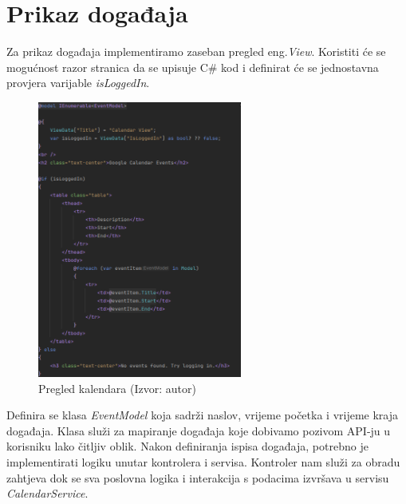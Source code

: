 \documentclass{foi}
\begin{document}
\section{Prikaz događaja}
Za prikaz događaja implementiramo zaseban pregled {eng.\textit{View}}. Koristiti će se mogućnost razor stranica da se upisuje C\# kod i definirat će se jednostavna provjera varijable \textit{isLoggedIn}. 
\begin{figure}[H]
    \centering
    \includegraphics[width=0.6\textwidth]{slike/calendarView.png}
    \caption{Pregled kalendara (Izvor: autor)}
    \label{fig:calendarView}

\end{figure}
Definira se klasa \textit{EventModel} koja sadrži naslov, vrijeme početka i vrijeme kraja događaja. Klasa služi za mapiranje događaja koje dobivamo pozivom API-ju u korisniku lako čitljiv oblik. 
Nakon definiranja ispisa događaja, potrebno je implementirati logiku unutar kontrolera i servisa. Kontroler nam služi za obradu zahtjeva dok se sva poslovna logika i interakcija s podacima izvršava u servisu {\textit{CalendarService}}.
\end{document}
